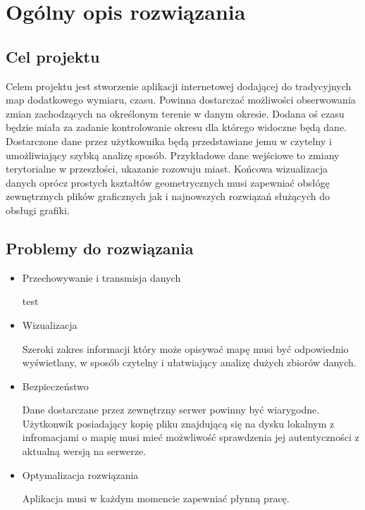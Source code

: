 \chapter{Ogólny opis rozwiązania}
\label{cha:opis}

\section{Cel projektu}
\label{sec:celProjektu}

Celem projektu jest stworzenie aplikacji internetowej dodającej do tradycyjnych map dodatkowego wymiaru, czasu. Powinna dostarczać możliwości obserwowania zmian zachodzących na określonym terenie w danym okresie. Dodana oś czasu będzie miała za zadanie kontrolowanie okresu dla którego widoczne będą dane. Dostarczone dane przez użytkownika będą przedstawiane jemu w czytelny i umożliwiający szybką analizę sposób. Przykładowe dane wejściowe to zmiany terytorialne w przeszłości, ukazanie rozowuju miast. Końcowa wizualizacja danych oprócz prostych kształtów geometrycznych musi zapewniać obsłógę zewnętrznych plików graficznych jak i najnowszych rozwiązań służących do obsługi grafiki.

\section{Problemy do rozwiązania}
\label{sec:problemy}

\begin{itemize}

\item
Przechowywanie i transmisja danych

test

\item
Wizualizacja

Szeroki zakres informacji który może opisywać mapę musi być odpowiednio wyświetlany, w sposób czytelny i ułatwiający analizę dużych zbiorów danych.

\item
Bezpieczeństwo

Dane dostarczane przez zewnętrzny serwer powinny być wiarygodne. Użytkonwik posiadający kopię pliku znajdującą się na dysku lokalnym z infromacjami o mapię musi mieć możwliwość sprawdzenia jej autentyczności z aktualną wersją na serwerze.

\item
Optymalizacja rozwiązania

Aplikacja musi w każdym momencie zapewniać płynną pracę.

\end{itemize}

